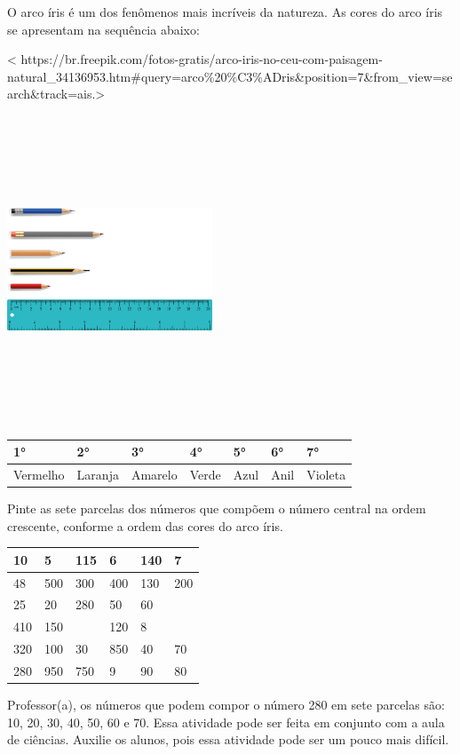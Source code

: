 O arco íris é um dos fenômenos mais incríveis da natureza. As cores do
arco íris se apresentam na sequência abaixo:

\textless{}
https://br.freepik.com/fotos-gratis/arco-iris-no-ceu-com-paisagem-natural\_34136953.htm\#query=arco\%20\%C3\%ADris\&position=7\&from\_view=search\&track=ais.\textgreater{}

\includegraphics[width=2.40278in,height=3.60417in]{media/image30.png}

\begin{longtable}[]{@{}lllllll@{}}
\toprule
1° & 2° & 3° & 4° & 5° & 6° & 7°\tabularnewline
\midrule
\endhead
Vermelho & Laranja & Amarelo & Verde & Azul & Anil &
Violeta\tabularnewline
\bottomrule
\end{longtable}

Pinte as sete parcelas dos números que compõem o número central na ordem
crescente, conforme a ordem das cores do arco íris.

\begin{longtable}[]{@{}llllll@{}}
\toprule
10 & 5 & 115 & 6 & 140 & 7\tabularnewline
\midrule
\endhead
48 & 500 & 300 & 400 & 130 & 200\tabularnewline
25 & 20 & 280 & 50 & 60\tabularnewline
410 & 150 & & 120 & 8\tabularnewline
320 & 100 & 30 & 850 & 40 & 70\tabularnewline
280 & 950 & 750 & 9 & 90 & 80\tabularnewline
\bottomrule
\end{longtable}

Professor(a), os números que podem compor o número 280 em sete parcelas
são: 10, 20, 30, 40, 50, 60 e 70. Essa atividade pode ser feita em
conjunto com a aula de ciências. Auxilie os alunos, pois essa atividade
pode ser um pouco mais difícil.

